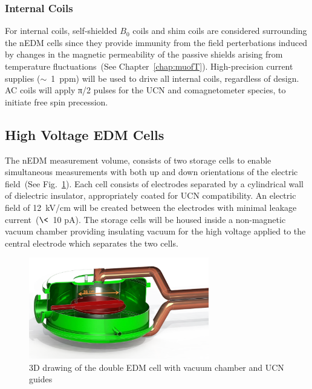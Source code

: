 \subsubsection{Internal Coils}
For internal coils, self-shielded $B_0$ coils and shim coils are
considered surrounding the nEDM cells since they provide immunity from
the field perterbations induced by changes in the magnetic
permeability of the passive shields arising from temperature
fluctuations~(See Chapter~\ref{chap:muofT}).  High-precision current
supplies ($\sim$~1~ppm) will be used to drive all internal coils,
regardless of design.  AC coils will apply π/2 pulses for the UCN and
comagnetometer species, to initiate free spin precession.






\subsection{High Voltage EDM Cells}
The nEDM measurement volume, consists of two storage cells to enable
simultaneous measurements with both up and down orientations of the
electric field~(See Fig.~\ref{fig:HVcell}). Each cell consists of
electrodes separated by a cylindrical wall of dielectric insulator,
appropriately coated for UCN compatibility. An electric field of
12~kV/cm will be created between the electrodes with minimal leakage
current~($\<$~10 pA).  The storage cells will be housed inside a
non-magnetic vacuum chamber providing insulating vacuum for the high
voltage applied to the central electrode which separates the two
cells.

\begin{figure}[h!]
  \centering
  \includegraphics[width=0.7\textwidth]{HVcell.png}
  \caption{3D drawing of the double EDM cell with vacuum chamber and
    UCN guides}
  \label{fig:HVcell}
\end{figure}



